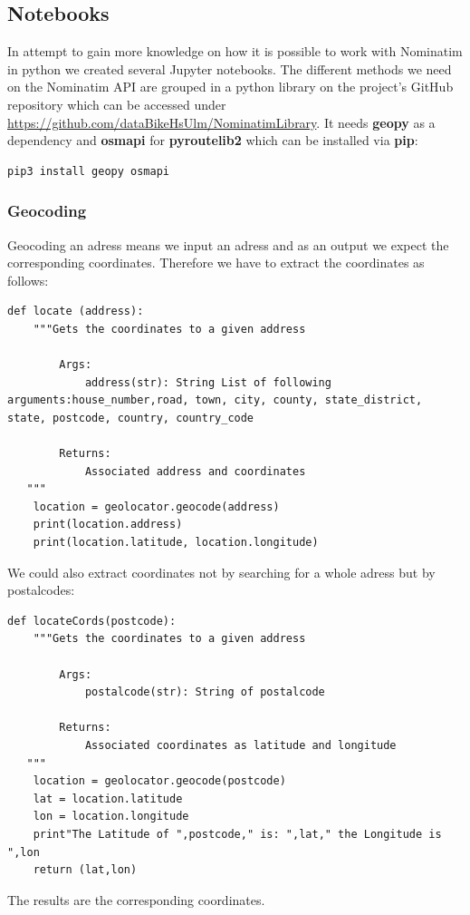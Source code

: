 \documentclass[12pt]{article}
\begin{document}
\subsection{Notebooks}
In attempt to gain more knowledge on how it is possible to work with Nominatim in python we created several Jupyter notebooks. The different methods we need on the Nominatim API are grouped in a python library on the project's GitHub repository which can be accessed under\\ \href{https://github.com/dataBikeHsUlm/NominatimLibrary}{https://github.com/dataBikeHsUlm/NominatimLibrary}.
It needs \textbf{geopy} as a dependency and \textbf{osmapi} for \textbf{pyroutelib2} which can be installed via \textbf{pip}:
\begin{lstlisting}[language=bash,breaklines=true]
pip3 install geopy osmapi
\end{lstlisting}
\subsubsection{Geocoding}
Geocoding an adress means we input an adress and as an output we expect the corresponding coordinates. Therefore we have to extract the coordinates as follows:
\begin{lstlisting}[breaklines=true]
def locate (address):
    """Gets the coordinates to a given address
        
        Args: 
            address(str): String List of following arguments:house_number,road, town, city, county, state_district, state, postcode, country, country_code
	        
        Returns: 
            Associated address and coordinates 
   """
    location = geolocator.geocode(address)
    print(location.address)
    print(location.latitude, location.longitude)
\end{lstlisting}
We could also extract coordinates not by searching for a whole adress but by postalcodes:
\begin{lstlisting}[breaklines=true]
def locateCords(postcode):
    """Gets the coordinates to a given address
        
        Args: 
            postalcode(str): String of postalcode
	        
        Returns: 
            Associated coordinates as latitude and longitude
   """
    location = geolocator.geocode(postcode)
    lat = location.latitude
    lon = location.longitude
    print"The Latitude of ",postcode," is: ",lat," the Longitude is ",lon
    return (lat,lon)
\end{lstlisting}
The results are the corresponding coordinates.
\end{document}
